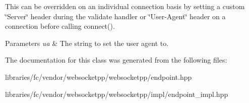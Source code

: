 This can be overridden on an individual connection basis by setting a custom \char`\"{}\+Server\char`\"{} header during the validate handler or \char`\"{}\+User-\/\+Agent\char`\"{} header on a connection before calling connect().


\begin{DoxyParams}{Parameters}
{\em ua} & The string to set the user agent to. \\
\hline
\end{DoxyParams}


The documentation for this class was generated from the following files\+:\begin{DoxyCompactItemize}
\item 
libraries/fc/vendor/websocketpp/websocketpp/endpoint.\+hpp\item 
libraries/fc/vendor/websocketpp/websocketpp/impl/endpoint\+\_\+impl.\+hpp\end{DoxyCompactItemize}
